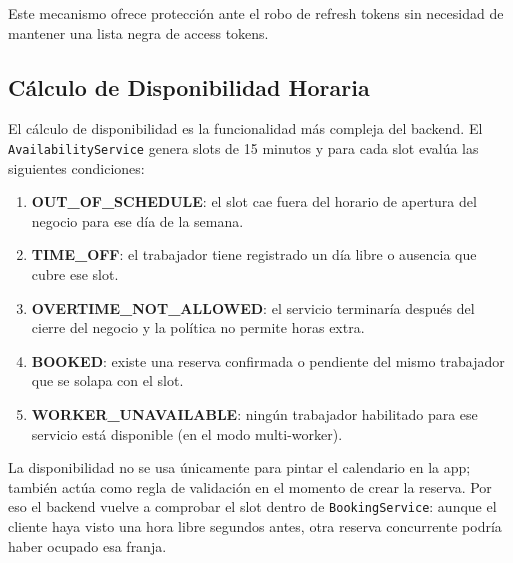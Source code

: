 \documentclass[12pt,a4paper,twoside]{report}
\begin{document}
Este mecanismo ofrece protección ante el robo de refresh tokens sin necesidad de mantener una lista negra de access tokens.

\subsection{Cálculo de Disponibilidad Horaria}

El cálculo de disponibilidad es la funcionalidad más compleja del backend. El \texttt{AvailabilityService} genera slots de 15 minutos y para cada slot evalúa las siguientes condiciones:

\begin{enumerate}
  \item \textbf{OUT\_OF\_SCHEDULE}: el slot cae fuera del horario de apertura del negocio para ese día de la semana.
  \item \textbf{TIME\_OFF}: el trabajador tiene registrado un día libre o ausencia que cubre ese slot.
  \item \textbf{OVERTIME\_NOT\_ALLOWED}: el servicio terminaría después del cierre del negocio y la política no permite horas extra.
  \item \textbf{BOOKED}: existe una reserva confirmada o pendiente del mismo trabajador que se solapa con el slot.
  \item \textbf{WORKER\_UNAVAILABLE}: ningún trabajador habilitado para ese servicio está disponible (en el modo multi-worker).
\end{enumerate}

La disponibilidad no se usa únicamente para pintar el calendario en la app; también actúa como regla de validación en el momento de crear la reserva. Por eso el backend vuelve a comprobar el slot dentro de \texttt{BookingService}: aunque el cliente haya visto una hora libre segundos antes, otra reserva concurrente podría haber ocupado esa franja.
\end{document}
